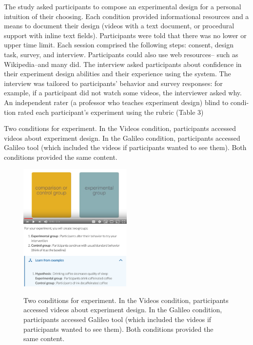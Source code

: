 The study asked participants to compose an experimental design for a personal intuition of their choosing. Each condition provided informational resources and a means to document their design (videos with a text document, or procedural support with inline text fields). Participants were told that there was no lower or upper time limit. Each session comprised the following steps: consent, design task, survey, and interview. Participants could also use web resources-- such as Wikipedia--and many did. The interview asked participants about confidence in their experiment design abilities and their experience using the system. The interview was tailored to participants’ behavior and survey responses: for example, if a participant did not watch some videos, the interviewer asked why. An independent rater (a professor who teaches experiment design) blind to condi-tion rated each participant’s experiment using the rubric (Table 3)

Two conditions for experiment. In the Videos condition, participants accessed videos about experiment design. In the Galileo condition, participants accessed Galileo tool (which included the videos if participants wanted to see them). Both conditions provided the same content.

\begin{figure}[h] 
  \includegraphics[width=0.5\textwidth]{figures/galileo/galileo-study-1}
  \includegraphics[width=0.5\textwidth]{figures/galileo/galileo-study-2}
  \caption[]
{Two conditions for experiment. In the Videos condition, participants accessed videos about experiment design. In the Galileo condition, participants accessed Galileo tool (which included the videos if participants wanted to see them). Both conditions provided the same content. }
  \label{fig:galileo-study}
\end{figure}

